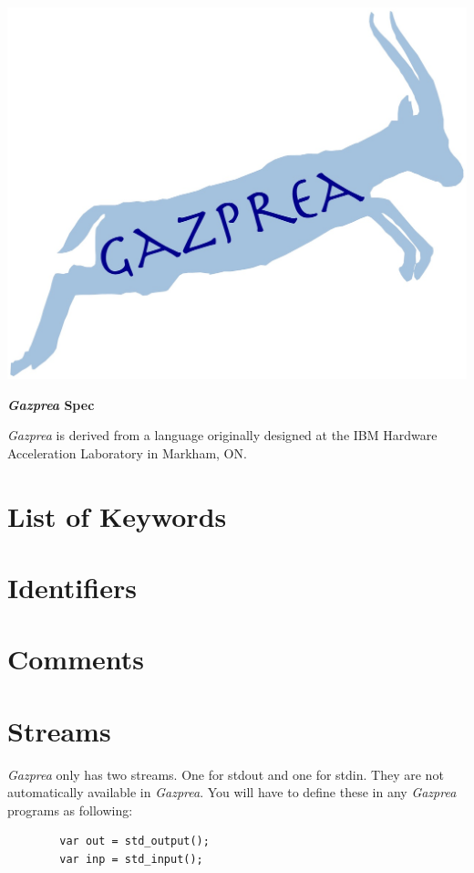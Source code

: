 \documentclass{article}
\begin{document}
	\includegraphics[width=.5\textwidth]{static/GazpreaLogo.png}

	\ifpdf
		\LARGE
		\textbf{\textit{Gazprea} Spec}
		\normalsize
	\fi

\ifpdf
  \hspace{.7in}
\fi

\textit{Gazprea} is derived from a language originally designed at the IBM Hardware Acceleration
Laboratory in Markham, ON.

\section{List of Keywords}


\section{Identifiers}
\label{sec:identifiers}


\section{Comments}
\label{sec:comments}



\section{Streams}\label{sec:streams}
	\textit{Gazprea} only has two streams. One for stdout and one for stdin. They are not automatically available in
	\textit{Gazprea}.  You will have to define these in any \textit{Gazprea} programs as following:

	\begin{lstlisting}
		var out = std_output();
		var inp = std_input();
	\end{lstlisting}
\end{document}
